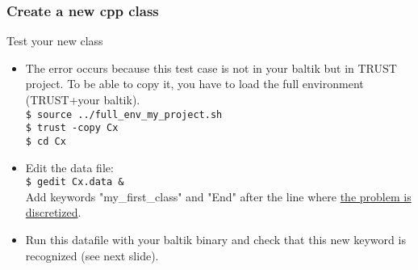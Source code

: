 \documentclass[10pt, hyperref={unicode=true,pdfusetitle, bookmarks=true,bookmarksnumbered=false,bookmarksopen=false, breaklinks=false,pdfborder={0 0 1},backref=true,colorlinks=true,linkcolor=darkblue,pageanchor, urlcolor=darkblue}]{beamer}
\begin{document}
\begin{frame}
\frametitle{Create a new cpp class}
\begin{block}{Test your new class}

\begin{itemize}
\item The error occurs because this test case is not in your baltik but in TRUST project. To be able to copy it, you have to load the full environment (TRUST+your baltik).\\
\texttt{\$ source ../full\_env\_my\_project.sh}\\
\texttt{\$ trust -copy Cx}\\
\texttt{\$ cd Cx}\\

\item Edit the data file:\\
\texttt{\$ gedit Cx.data \&} \\
Add keywords "my\_first\_class" and "End" after the line where \underline{the problem is discretized}.\\

\item Run this datafile with your baltik binary and check that this new keyword is recognized (see next slide).
\end{itemize}

\end{block}
\end{frame}
\end{document}
